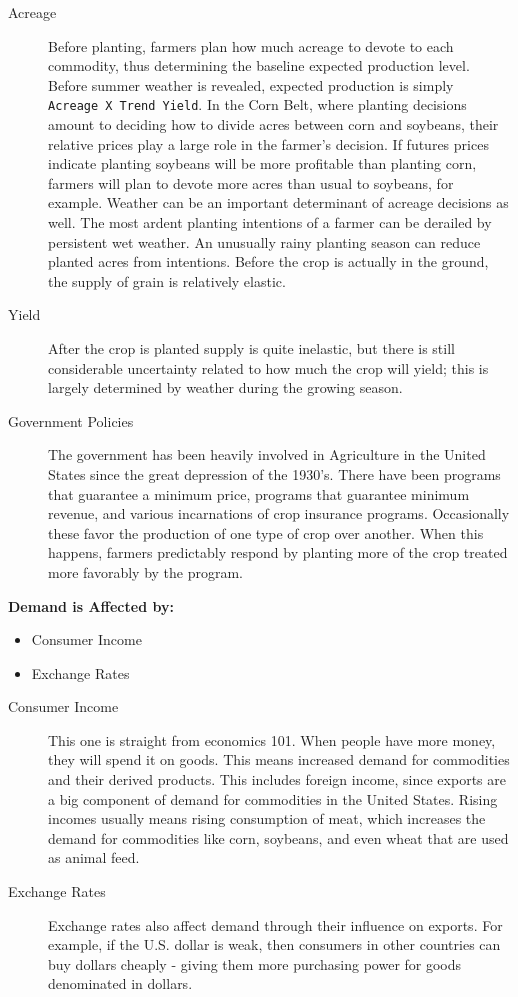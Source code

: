 \documentclass[
]{book}
\providecommand{\tightlist}{%
  \setlength{\itemsep}{0pt}\setlength{\parskip}{0pt}}
\begin{document}
\begin{description}
\item[Acreage]
Before planting, farmers plan how much acreage to devote to each commodity, thus determining the baseline expected production level. Before summer weather is revealed, expected production is simply \texttt{Acreage\ X\ Trend\ Yield}. In the Corn Belt, where planting decisions amount to deciding how to divide acres between corn and soybeans, their relative prices play a large role in the farmer's decision. If futures prices indicate planting soybeans will be more profitable than planting corn, farmers will plan to devote more acres than usual to soybeans, for example. Weather can be an important determinant of acreage decisions as well. The most ardent planting intentions of a farmer can be derailed by persistent wet weather. An unusually rainy planting season can reduce planted acres from intentions. Before the crop is actually in the ground, the supply of grain is relatively elastic.
\item[Yield]
After the crop is planted supply is quite inelastic, but there is still considerable uncertainty related to how much the crop will yield; this is largely determined by weather during the growing season.
\item[Government Policies]
The government has been heavily involved in Agriculture in the United States since the great depression of the 1930's. There have been programs that guarantee a minimum price, programs that guarantee minimum revenue, and various incarnations of crop insurance programs. Occasionally these favor the production of one type of crop over another. When this happens, farmers predictably respond by planting more of the crop treated more favorably by the program.
\end{description}

\textbf{Demand is Affected by:}

\begin{itemize}
\tightlist
\item
  Consumer Income
\item
  Exchange Rates
\end{itemize}

\begin{description}
\item[Consumer Income]
This one is straight from economics 101. When people have more money, they will spend it on goods. This means increased demand for commodities and their derived products. This includes foreign income, since exports are a big component of demand for commodities in the United States. Rising incomes usually means rising consumption of meat, which increases the demand for commodities like corn, soybeans, and even wheat that are used as animal feed.
\item[Exchange Rates]
Exchange rates also affect demand through their influence on exports. For example, if the U.S. dollar is weak, then consumers in other countries can buy dollars cheaply - giving them more purchasing power for goods denominated in dollars.
\end{description}
\end{document}
